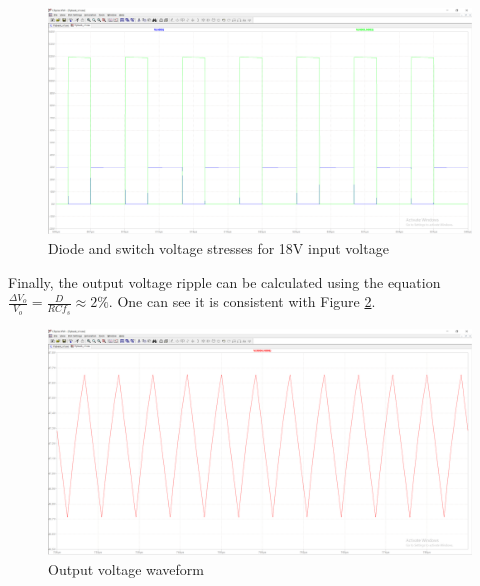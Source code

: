 \documentclass[12pt]{article}
\begin{document}
    \begin{figure}[H]
        \centering
        \includegraphics[scale=0.3]{img/Spice_Sim/Ideal/ideal_diode_switch_stresses_Vs_18V.PNG}
        \caption{Diode and switch voltage stresses for 18V input voltage}
        \label{fig:ideal_V_stress}
    \end{figure}

    Finally, the output voltage ripple can be calculated using the equation $\frac{\Delta V_o}{V_o} = \frac{D}{RC f_s} \approx 2\%$. One can see it is consistent with Figure \ref{fig:ideal_Vo}.

    \begin{figure}[H]
        \centering
        \includegraphics[scale=0.3]{img/Spice_Sim/Ideal/ideal_Vo_ripple_2.6uF.PNG}
        \caption{Output voltage waveform}
        \label{fig:ideal_Vo}
    \end{figure}
    
\end{document}

